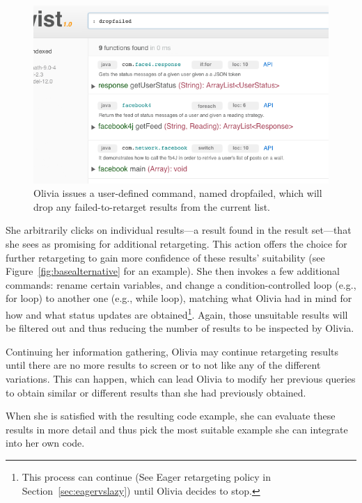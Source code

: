 \begin{figure}[!ht]
    \centering
    \includegraphics[width=\textwidth]{images/twistclean}
    \caption{Olivia issues a user-defined command, named dropfailed, which will drop 
	 any failed-to-retarget results from the current list.}
    \label{fig:twistclean}
\end{figure}   

She arbitrarily clicks on individual results---a result found in the result set---that she sees as promising for additional retargeting. This action offers the choice for further retargeting to gain more confidence of these results' suitability (see Figure~\ref{fig:basealternative} for an example). She then invokes a few additional commands: rename certain variables, and change a condition-controlled loop (e.g., for loop) to another one (e.g., while loop), matching what Olivia had in mind for how and what status updates are obtained\footnote{This process can continue (See Eager retargeting policy in Section~\ref{sec:eagervslazy}) until Olivia decides to stop.}. Again, those unsuitable results will be filtered out and thus reducing the number of results to be inspected by Olivia.

Continuing her information gathering, Olivia may continue retargeting results until there are no more results to screen or to not like any of the different variations. This can happen, which can lead Olivia to modify her previous queries to obtain similar or different results than she had previously obtained.

When she is satisfied with the resulting code example, she can evaluate these results in more detail and thus pick the most suitable example she can integrate into her own code.

